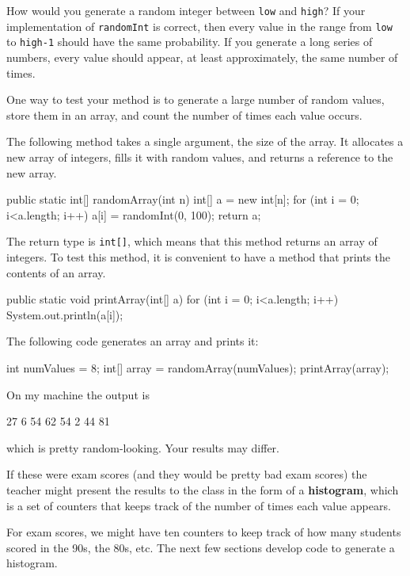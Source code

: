 How would you generate a random integer between {\tt low} and {\tt high}?
If your implementation of {\tt randomInt} is correct, then
every value in the range from {\tt low} to {\tt high-1} should
have the same probability.  If you generate a long series
of numbers, every value should appear, at least approximately,
the same number of times.

One way to test your method is to
generate a large number of random values,
store them in an array, and count the number of times each
value occurs.

The following method takes a single argument, the size of
the array.  It allocates a new array of integers, fills
it with random values, and returns a reference to the new
array.

\begin{code}
  public static int[] randomArray(int n) {
      int[] a = new int[n];
      for (int i = 0; i<a.length; i++) {
          a[i] = randomInt(0, 100);
      }
      return a;
  }
\end{code}
%
The return type is {\tt int[]}, which means that
this method returns an array of integers.
To test this method, it is convenient to have a method that
prints the contents of an array.

\begin{code}
  public static void printArray(int[] a) {
      for (int i = 0; i<a.length; i++) {
          System.out.println(a[i]);
      }
  }
\end{code}
%
The following code generates an array and prints it:

\begin{code}
    int numValues = 8;
    int[] array = randomArray(numValues);
    printArray(array);
\end{code}
%
On my machine the output is

\begin{stdout}
27
6
54
62
54
2
44
81
\end{stdout}
%
which is pretty random-looking.  Your results may differ.

If these were exam scores (and they would be pretty bad exam
scores) the teacher might present the results to the class
in the form of a {\bf histogram}, which is a set of counters
that keeps track of the number of times each value appears.


For exam scores, we might have ten counters to keep track of
how many students scored in the 90s, the 80s, etc.  The next
few sections develop code to generate a histogram.



